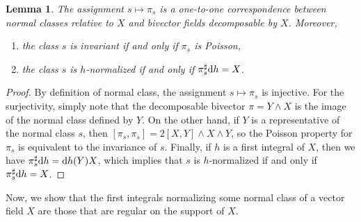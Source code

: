 \documentclass[10pt,a4paper]{amsart}
\newcommand{\dd}{{\rm d}}
\numberwithin{equation}{section}
\newtheorem{Lemma}[Theorem]{Lemma}
\begin{document}
\begin{Lemma}\label{lemma:OneToOne}
The assignment $s \mapsto \pi_{s}$ is a one-to-one correspondence between normal classes relative to $X$ and bivector fields decomposable by $X$. Moreover,
 \begin{enumerate}\itemsep=0pt
 \item[$(i)$] the class $s$ is invariant if and only if $\pi_{s}$ is Poisson,
 \item[$(ii)$] the class $s$ is $h$-normalized if and only if $\pi_{s}^{\sharp}\dd h = X$.
 \end{enumerate}
\end{Lemma}
\begin{proof}
By definition of normal class, the assignment $s \mapsto \pi_{s}$ is injective. For the surjectivity, simply note that the decomposable bivector $\pi = Y \wedge X$ is the image of the normal class defined by $Y$. On the other hand, if $Y$ is a representative of the normal class $s$, then $[\pi_{s},\pi_{s}] = 2 [X,Y] \wedge X \wedge Y$, so the Poisson property for $\pi_{s}$ is equivalent to the invariance of $s$. Finally, if $h$ is a first integral of $X$, then we have $\pi_{s}^{\sharp}\dd h = \dd h(Y) X$, which implies that $s$ is $h$-normalized if and only if $\pi_{s}^{\sharp}\dd h = X$.
\end{proof}

Now, we show that the first integrals normalizing some normal class of a vector field $X$ are those that are regular on the support of $X$.
\end{document}
